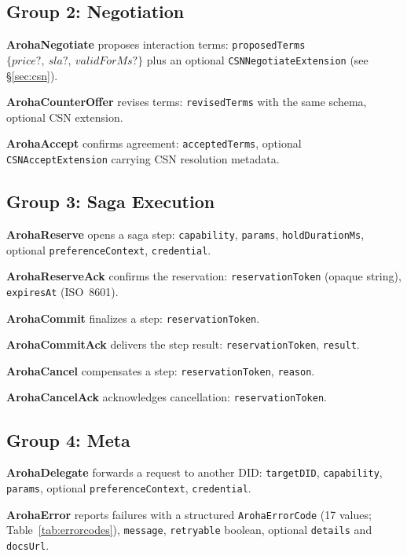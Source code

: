 \documentclass[conference]{IEEEtran}
\begin{document}
\subsection{Group 2: Negotiation}

\textbf{ArohaNegotiate} proposes interaction terms:
\texttt{proposedTerms} $\{\textit{price}?,\ \textit{sla}?,\
\textit{validForMs}?\}$ plus an optional
\texttt{CSNNegotiateExtension} (see \S\ref{sec:csn}).

\textbf{ArohaCounterOffer} revises terms: \texttt{revisedTerms}
with the same schema, optional CSN extension.

\textbf{ArohaAccept} confirms agreement: \texttt{acceptedTerms},
optional \texttt{CSNAcceptExtension} carrying CSN resolution metadata.

\subsection{Group 3: Saga Execution}

\textbf{ArohaReserve} opens a saga step: \texttt{capability},
\texttt{params}, \texttt{holdDurationMs}, optional
\texttt{preferenceContext}, \texttt{credential}.

\textbf{ArohaReserveAck} confirms the reservation:
\texttt{reservationToken} (opaque string), \texttt{expiresAt} (ISO~8601).

\textbf{ArohaCommit} finalizes a step: \texttt{reservationToken}.

\textbf{ArohaCommitAck} delivers the step result:
\texttt{reservationToken}, \texttt{result}.

\textbf{ArohaCancel} compensates a step: \texttt{reservationToken},
\texttt{reason}.

\textbf{ArohaCancelAck} acknowledges cancellation:
\texttt{reservationToken}.

\subsection{Group 4: Meta}

\textbf{ArohaDelegate} forwards a request to another DID:
\texttt{targetDID}, \texttt{capability}, \texttt{params},
optional \texttt{preferenceContext}, \texttt{credential}.

\textbf{ArohaError} reports failures with a structured
\texttt{ArohaErrorCode} (17 values; Table~\ref{tab:errorcodes}),
\texttt{message}, \texttt{retryable} boolean,
optional \texttt{details} and \texttt{docsUrl}.
\end{document}

